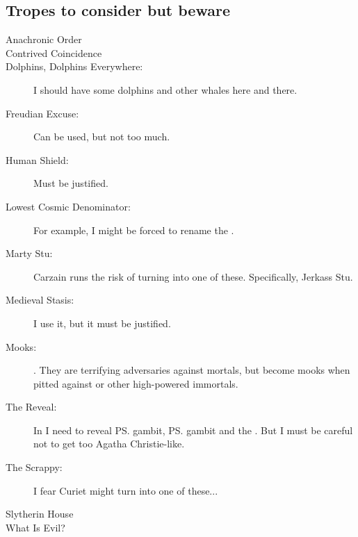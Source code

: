\begin{flushleft}
\section{Tropes to consider but beware}
\begin{description}
  \item[Anachronic Order]
  \item[Contrived Coincidence] 
  \item[Dolphins, Dolphins Everywhere:] 
    I should have some dolphins and other whales here and there.
  \item[Freudian Excuse:] 
    Can be used, but not too much. 
  \item[Human Shield:] Must be justified. 
  \item[Lowest Cosmic Denominator:] 
    For example, I might be forced to rename the .
  \item[Marty Stu:] 
    Carzain runs the risk of turning into one of these. 
    \subitem Specifically, Jerkass Stu.
  \item[Medieval Stasis:] 
    I use it, but it must be justified. 
  \item[Mooks:] 
    \Banes. They are terrifying adversaries against mortals, but become mooks when pitted against \dragons{} or other high-powered immortals.
  \item[The Reveal:] 
    In \TwilightAngelRememberEmph I need to reveal \ps{\Secherdamon} gambit, \ps{\Ishnaruchaefir} gambit and the . 
    But I must be careful not to get too Agatha Christie-like.
  \item[The Scrappy:] I fear Curiet might turn into one of these...
  \item[Slytherin House] 
  \item[What Is Evil?]
\end{description}




 
\end{flushleft}





